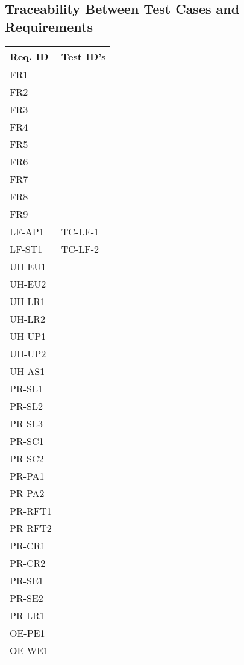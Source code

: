 \documentclass[12pt, titlepage]{article}
\begin{document}
\subsection{Traceability Between Test Cases and Requirements}


\begin{longtable}{|l|l|}
  \hline
  \textbf{Req. ID} & \textbf{Test ID's} \\
  \hline
  FR1 & \\ \hline
  FR2 & \\ \hline
  FR3 & \\ \hline
  FR4 & \\ \hline
  FR5 & \\ \hline
  FR6 & \\ \hline
  FR7 & \\ \hline
  FR8 & \\ \hline
  FR9 & \\ \hline
  LF-AP1 & TC-LF-1 \\ \hline
  LF-ST1 & TC-LF-2 \\ \hline
  UH-EU1 & \\ \hline
  UH-EU2 & \\ \hline
  UH-LR1 & \\ \hline
  UH-LR2 & \\ \hline
  UH-UP1 & \\ \hline
  UH-UP2 & \\ \hline
  UH-AS1 & \\ \hline
  PR-SL1 & \\ \hline
  PR-SL2 & \\ \hline
  PR-SL3 & \\ \hline
  PR-SC1 & \\ \hline
  PR-SC2 & \\ \hline
  PR-PA1 & \\ \hline
  PR-PA2 & \\ \hline
  PR-RFT1 & \\ \hline
  PR-RFT2 & \\ \hline
  PR-CR1 & \\ \hline
  PR-CR2 & \\ \hline
  PR-SE1 & \\ \hline
  PR-SE2 & \\ \hline
  PR-LR1 & \\ \hline
  OE-PE1 & \\ \hline
  OE-WE1 & \\ \hline

\end{longtable}
\end{document}
